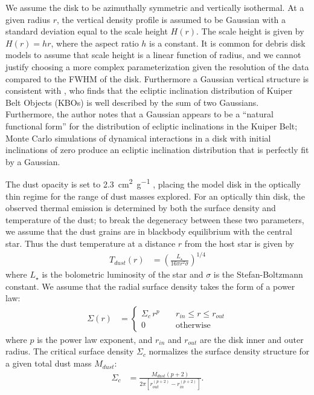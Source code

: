 \documentclass[modern]{aastex62}
\begin{document}
We assume the disk to be azimuthally symmetric and vertically isothermal. 
At a given radius $r$, the vertical density profile is assumed to be Gaussian with a standard deviation equal to the scale height $H(r)$.
The scale height is given by $H(r) = hr$, where the aspect ratio $h$ is a constant.
It is common for debris disk models to assume that scale height is a linear function of radius, and we cannot justify choosing a more complex parameterization given the resolution of the data compared to the FWHM of the disk.
Furthermore a Gaussian vertical structure is consistent with \citet{brown01}, who finds that the ecliptic inclination distribution of Kuiper Belt Objects (KBOs) is well described by the sum of two Gaussians.
Furthermore, the author notes that a Gaussian appears to be a ``natural functional form'' for the distribution of ecliptic inclinations in the Kuiper Belt; Monte Carlo simulations of dynamical interactions in a disk with initial inclinations of zero produce an ecliptic inclination distribution that is perfectly fit by a Gaussian.

The dust opacity is set to \SI{2.3}{\cm^2.\gram^{-1}} \citep{beckwith90}, placing the model disk in the optically thin regime for the range of dust masses explored.
For an optically thin disk, the observed thermal emission is determined by both the surface density and temperature of the dust; to break the degeneracy between these two parameters, we assume that the dust grains are in blackbody equilibrium with the central star.
Thus the dust temperature at a distance $r$ from the host star is given by
\begin{align}
  T_{dust} (r) &= \left( \frac{L_{\star}}{16 \pi r^2 \sigma} \right)^{1/4}
\end{align}
where $L_{\star}$ is the bolometric luminosity of the star and $\sigma$ is the Stefan-Boltzmann constant. We assume that the radial surface density takes the form of a power law: 
\begin{align}
  \Sigma(r) &= 
  \begin{cases}
    \Sigma_c \, r^{p} \; \; \; \; & r_{in} \leq r \leq r_{out} \\
    0 \; \; \; \; &\mbox{otherwise} 
  \end{cases}
\end{align}
where $p$ is the power law exponent, and $r_{in}$ and $r_{out}$ are the disk inner and outer radius. 
The critical surface density $\Sigma_c$ normalizes the surface density structure for a given total dust mass $M_{dust}$:
\begin{align}
\Sigma_c &= \frac{M_{dust} \left(p + 2 \right)}{2 \pi \left[ r_{out}^{(p+2)} - r_{in}^{(p+2)} \right]}.
\end{align}
\end{document}
